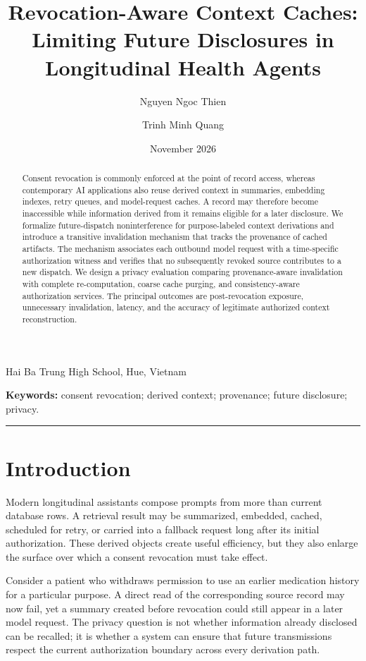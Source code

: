 \documentclass[11pt,a4paper]{article}
\title{\vspace{-1em}\textbf{Revocation-Aware Context Caches: Limiting Future Disclosures in Longitudinal Health Agents}}
\author{Nguyen Ngoc Thien \and Trinh Minh Quang}\date{November 2026}
\begin{document}
\maketitle
\begin{center}\small Hai Ba Trung High School, Hue, Vietnam\end{center}
\begin{abstract}
Consent revocation is commonly enforced at the point of record access, whereas contemporary AI applications also reuse derived context in summaries, embedding indexes, retry queues, and model-request caches. A record may therefore become inaccessible while information derived from it remains eligible for a later disclosure. We formalize future-dispatch noninterference for purpose-labeled context derivations and introduce a transitive invalidation mechanism that tracks the provenance of cached artifacts. The mechanism associates each outbound model request with a time-specific authorization witness and verifies that no subsequently revoked source contributes to a new dispatch. We design a privacy evaluation comparing provenance-aware invalidation with complete re-computation, coarse cache purging, and consistency-aware authorization services. The principal outcomes are post-revocation exposure, unnecessary invalidation, latency, and the accuracy of legitimate authorized context reconstruction.
\end{abstract}
\noindent\textbf{Keywords:} consent revocation; derived context; provenance; future disclosure; privacy.
\medskip\hrule\medskip

\section{Introduction}
Modern longitudinal assistants compose prompts from more than current database rows. A retrieval result may be summarized, embedded, cached, scheduled for retry, or carried into a fallback request long after its initial authorization. These derived objects create useful efficiency, but they also enlarge the surface over which a consent revocation must take effect.

Consider a patient who withdraws permission to use an earlier medication history for a particular purpose. A direct read of the corresponding source record may now fail, yet a summary created before revocation could still appear in a later model request. The privacy question is not whether information already disclosed can be recalled; it is whether a system can ensure that future transmissions respect the current authorization boundary across every derivation path.
\end{document}
